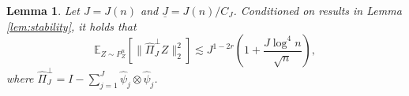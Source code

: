 \documentclass[11pt,a4paper]{article}
\renewcommand{\hat}{\widehat}
\theoremstyle{definition}
\theoremstyle{plain}
\newtheorem{lemma}{Lemma}[section]
\theoremstyle{remark}
\newcommand{\und}{\underline}
\begin{document}
\begin{lemma}
Let $J=J(n)$ and $\und J=J(n)/C_J$.
Conditioned on results in Lemma \ref{lem:stability}, it holds that
$$
\mathbb E_{Z\sim P_Z^n}[\|\hat\Pi_J^\perp Z\|_2^2] \lesssim J^{1-2r}\left(1+\frac{J\log^4 n}{\sqrt{n}}\right),
$$
where $\hat\Pi_{J}^\perp = I-\sum_{j=1}^{J}\hat\psi_j\otimes\hat\psi_j$.
\label{lem:truncation}
\end{lemma}
\end{document}
